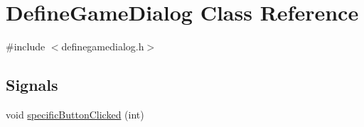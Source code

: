 \hypertarget{class_define_game_dialog}{
\section{DefineGameDialog Class Reference}
\label{class_define_game_dialog}
}


{\ttfamily \#include $<$definegamedialog.h$>$}

\subsection*{Signals}
\begin{DoxyCompactItemize}
\item 
void \hyperlink{class_define_game_dialog_aedaa55de22c0486cf558e5a90bc05b50}{specificButtonClicked} (int)
\end{DoxyCompactItemize}
